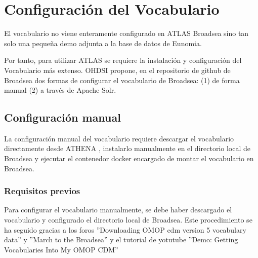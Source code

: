 \chapter{Configuración del Vocabulario} \label{cap:05Vocab}

El vocabulario no viene enteramente configurado en ATLAS Broadsea sino tan solo una pequeña demo adjunta a la base de datos de Eunomia.

Por tanto, para utilizar ATLAS se requiere la instalación y configuración del Vocabulario más extenso. OHDSI propone, en el repositorio de github de Broadsea \cite{githubBroadsea} dos formas de configurar el vocabulario de Broadsea: (1) de forma manual (2) a través de Apache Solr. 

\section{Configuración manual} \label{sec:05ConfigManual}

La configuración manual del vocabulario requiere descargar el vocabulario directamente desde ATHENA \cite{athena}, instalarlo manualmente en el directorio local de Broadsea y ejecutar el contenedor docker encargado de montar el vocabulario en Broadsea. 

\subsection{Requisitos previos} \label{subsec:05requisitos}

Para configurar el vocabulario manualmente,  se debe haber descargado el vocabulario y configurado el directorio local de Broadsea. Este procedimiento se ha seguido gracias a los foros ''Downloading OMOP cdm version 5 vocabulary data'' \cite{forumCDMdownload} y ''March to the Broadsea'' \cite{forumMarchBroadsea} y el tutorial de yotutube ''Demo: Getting Vocabularies Into My OMOP CDM'' \cite{youtubeVocab}

